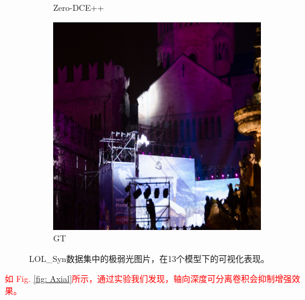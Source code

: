 \documentclass[a4paper]{ctexart}
\begin{document}
\begin{figure}[htb]
\begin{subfigure}{0.19\textwidth}
				\captionsetup{font=scriptsize}
				\caption{Zero-DCE++}
				\label{fig: Zero-DCE++2}
			\end{subfigure}
			\begin{subfigure}{0.19\textwidth}
				\includegraphics[width=\linewidth]{picture/LLIE/Experiment/input_gt}
				\captionsetup{font=scriptsize}
				\caption{GT}
				\label{fig: input_gt}
			\end{subfigure}
			\caption{
				\label{fig: dark1}
				LOL\_Syn数据集中的极弱光图片，在13个模型下的可视化表现。
			}
		\end{figure}
		
		\textcolor{red}{如 Fig. \ref{fig: Axial}所示，通过实验我们发现，轴向深度可分离卷积会抑制增强效果。}
		
\end{document}
